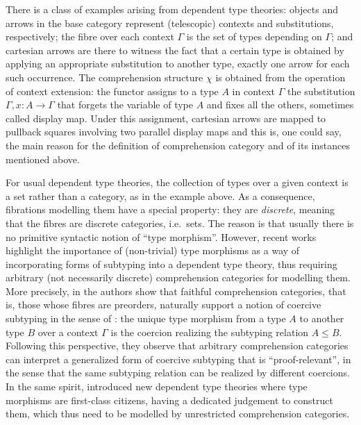 \documentclass{lmcs} %
\theoremstyle{plain}\newtheorem{satz}[thm]{Satz} %
\begin{document}
There is a class of examples arising from dependent type theories:
objects and arrows in the base category represent (telescopic) contexts and substitutions, respectively;
the fibre over each context $\Gamma$ is the set of types depending on $\Gamma$;
and cartesian arrows are there to witness the fact that a certain type is obtained by applying an appropriate substitution to another type, exactly one arrow for each such occurrence.
The comprehension structure $\chi$ is obtained from the operation of context extension: the functor assigns to a type $A$ in context $\Gamma$ the substitution $\Gamma, x:A\to \Gamma$ that forgets the variable of type $A$ and fixes all the others, sometimes called display map.
Under this assignment, cartesian arrows are mapped to pullback squares involving two parallel display maps and this is, one could say, the main reason for the definition of comprehension category and of its instances mentioned above.

For usual dependent type theories, the collection of types over a given context is a set rather than a category, as in the example above.
As a consequence, fibrations modelling them have a special property: they are \emph{discrete}, meaning that the fibres are discrete categories, i.e.~sets. 
The reason is that usually there is no primitive syntactic notion of ``type morphism''. 
% 
However, recent works \cite{adjedj2026adaptt, coraglia2023categorical, najmaei2026semantics} highlight the importance of (non-trivial) type morphisms as a way of incorporating forms of subtyping into a dependent type theory, thus requiring arbitrary (not necessarily discrete) comprehension categories for modelling them. 
More precisely, in \cite{coraglia2023categorical} the authors show that faithful comprehension categories, that is, those whose fibres are preorders, 
naturally support a notion of coercive subtyping in the sense of \cite{luo2013coercive}: 
the unique type morphism from a type $A$ to another type $B$ over a context $\Gamma$ is the coercion  realizing  the subtyping relation $A\leq B$. 
Following this perspective, they observe that arbitrary comprehension categories can interpret 
a generalized form of coercive subtyping that is ``proof-relevant'', in the sense that the same subtyping relation can be realized by different coercions. 
In the same spirit, \cite{najmaei2026semantics, adjedj2026adaptt} introduced new dependent type theories where type morphisms are first-class citizens, having a dedicated judgement to construct them, which thus need to be modelled by unrestricted comprehension categories. 
\end{document}
